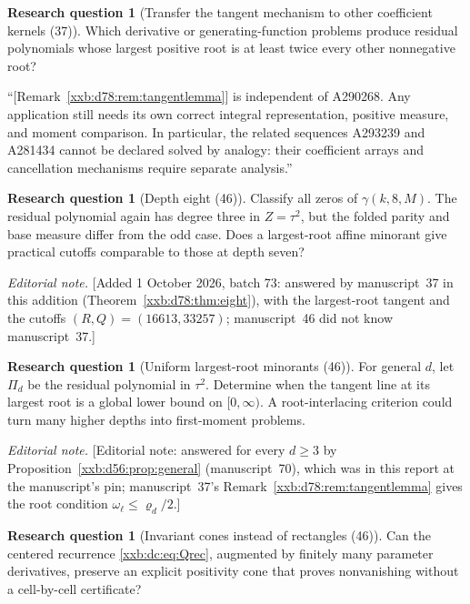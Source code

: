 \documentclass[11pt,a4paper]{article}
\numberwithin{equation}{section}
\theoremstyle{definition}
\newtheorem{question}[theorem]{Research question}
\theoremstyle{remark}
\theoremstyle{plain}
\begin{document}
\begin{question}[Transfer the tangent mechanism to other coefficient kernels (37)]\label{xxb:d78:q:transfer}
Which derivative or generating-function problems produce residual polynomials
whose largest positive root is at least twice every other nonnegative root?
\end{question}
``[Remark~\ref{xxb:d78:rem:tangentlemma}] is independent of A290268. Any
application still needs its own correct integral representation, positive
measure, and moment comparison. In particular, the related sequences A293239
and A281434 cannot be declared solved by analogy: their coefficient arrays and
cancellation mechanisms require separate analysis.''

\begin{question}[Depth eight (46)]\label{xxb:d7:q:eight}
Classify all zeros of $\gamma(k,8,M)$.  The residual polynomial again has
degree three in $Z=\tau^2$, but the folded parity and base measure differ from
the odd case.  Does a largest-root affine minorant give practical cutoffs
comparable to those at depth seven?
\end{question}
\emph{Editorial note.}  [Added 1 October 2026, batch 73: answered by
manuscript~37 in this addition (Theorem~\ref{xxb:d78:thm:eight}), with the
largest-root tangent and the cutoffs $(R,Q)=(16613,33257)$; manuscript~46 did
not know manuscript~37.]

\begin{question}[Uniform largest-root minorants (46)]\label{xxb:d7:q:uniform}
For general $d$, let $\Pi_d$ be the residual polynomial in $\tau^2$.
Determine when the tangent line at its largest root is a global lower bound on
$[0,\infty)$.  A root-interlacing criterion could turn many higher depths into
first-moment problems.
\end{question}
\emph{Editorial note.}  [Editorial note: answered for every $d\ge3$ by
Proposition~\ref{xxb:d56:prop:general} (manuscript~70), which was in this
report at the manuscript's pin; manuscript~37's
Remark~\ref{xxb:d78:rem:tangentlemma} gives the root condition
$\omega_\ell\le\varrho_d/2$.]

\begin{question}[Invariant cones instead of rectangles (46)]\label{xxb:d7:q:cones}
Can the centered recurrence \eqref{xxb:dc:eq:Qrec}, augmented by finitely many
parameter derivatives, preserve an explicit positivity cone that proves
nonvanishing without a cell-by-cell certificate?
\end{question}
\end{document}
